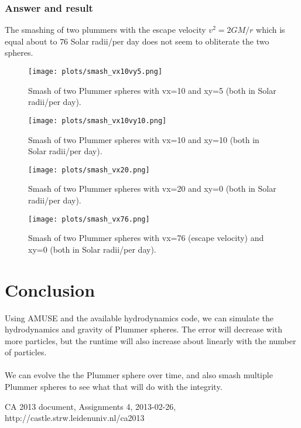 \documentclass[a4paper]{article}
\begin{document}
\subsubsection{Answer and result}
The smashing of two plummers with the escape velocity $v^2=2GM/r$ which is equal about to $76$ Solar radii/per day does not seem to obliterate the two spheres.
\begin{figure}[h!]
  \begin{center}
    \texttt{[image: plots/smash\_vx10vy5.png]}
    \caption{\label{fig:errorploty}Smash of two Plummer spheres with vx=10 and xy=5 (both in Solar radii/per day).}
  \end{center}
\end{figure}
\begin{figure}[h!]
  \begin{center}
    \texttt{[image: plots/smash\_vx10vy10.png]}
    \caption{\label{fig:errorplotyy}Smash of two Plummer spheres with vx=10 and xy=10 (both in Solar radii/per day).}
  \end{center}
\end{figure}
\begin{figure}[h!]
  \begin{center}
    \texttt{[image: plots/smash\_vx20.png]}
    \caption{\label{fig:errorplotyyy}Smash of two Plummer spheres with vx=20 and xy=0 (both in Solar radii/per day).}
  \end{center}
\end{figure}
\begin{figure}[h!]
  \begin{center}
    \texttt{[image: plots/smash\_vx76.png]}
    \caption{\label{fig:errorplotyyyy}Smash of two Plummer spheres with vx=76 (escape velocity) and xy=0 (both in Solar radii/per day).}
  \end{center}
\end{figure}
\clearpage
\section{Conclusion}
\label{sec:Conclusion}
Using AMUSE and the available hydrodynamics code, we can simulate the hydrodynamics and gravity of Plummer spheres. The error will decrease with more particles, but the runtime will also increase about linearly with the number of particles. \\
\\
We can evolve the the Plummer sphere over time, and also smash multiple Plummer spheres to see what that will do with the integrity.
\clearpage
\begin{thebibliography}{99}
 CA 2013 document, Assignments 4, 2013-02-26, http://castle.strw.leidenuniv.nl/ca2013
\end{thebibliography}
\end{document}
